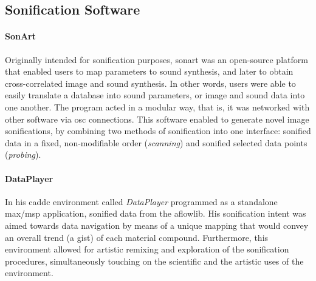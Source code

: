 \documentclass[
]{book}
\begin{document}
\subsection{Sonification Software}
\label{sonification:software}

\paragraph{SonArt}
Originally intended for sonification purposes, \gls{sonart} \parencite{icad/2002/ben-tal} was an open-source platform that enabled users to map parameters to sound synthesis, and later \parencite{icmc/bbp2372.2004.128} to obtain cross-correlated image and sound synthesis. In other words, users were able to easily translate a database into sound parameters, or image and sound data into one another. The program acted in a modular way, that is, it was networked with other software via \gls{osc} connections. This software enabled \textcite{DBLP:conf/icmc/YeoB05} to generate novel image sonifications, by combining two methods of sonification into one interface: sonified data in a fixed, non-modifiable order (\textit{scanning}) and sonified selected data points (\textit{probing}).

\paragraph{DataPlayer}
In his \gls{caddc} environment called \textit{DataPlayer} programmed as a standalone \gls{max/msp} application, \textcite{icmc/bbp2372.2015.072} sonified data from the \gls{aflowlib}. His sonification intent was aimed towards data navigation by means of a unique mapping that would convey an overall trend (a gist) of each material compound. Furthermore, this environment allowed for artistic remixing and exploration of the sonification procedures, simultaneously touching on the scientific and the artistic uses of the environment.
\end{document}
